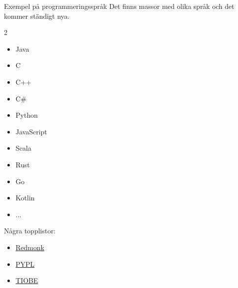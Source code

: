 \begin{Slide}{Exempel på programmeringsspråk}
Det finns massor med olika språk och det kommer ständigt nya.
\vspace{1em}
\begin{multicols}{2}
\begin{itemize}
\item Java
\item C
\item C++
\item C\#
\item Python
\item JavaScript
\item Scala
\item Rust
\item Go
\item Kotlin
\item ...
\end{itemize}

\columnbreak %

Några topplistor:
\begin{itemize}
\item \href{https://redmonk.com/sogrady/2025/06/18/language-rankings-1-25/}{Redmonk}   
\item \href{http://pypl.github.io/PYPL.html}{PYPL}
\item \href{https://www.tiobe.com/tiobe-index/}{TIOBE}
\end{itemize}
\end{multicols}

\end{Slide}



